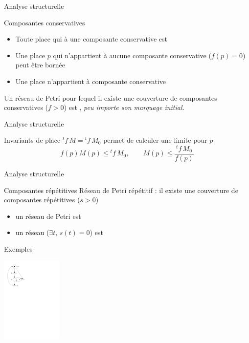 \documentclass[compress]{beamer}
\begin{document}
\begin{frame}{Analyse structurelle}
\begin{block}{Composantes conservatives}
\begin{itemize}
\item Toute place qui  à une composante conservative  est 
\item Une place $p$ qui n'appartient à aucune composante conservative ($f(p)=0$) peut être bornée
\item Une place  n'appartient à  composante conservative
\end{itemize}
Un réseau de Petri pour lequel il existe une couverture de composantes 
conservatives ($f>0$) est , {\it peu importe son marquage initial.}
\end{block}
\end{frame}  
 
\begin{frame}{Analyse structurelle}
\begin{block}{Invariants de place}
${}^tf \, M = {}^tf \, M_0$ permet de calculer une limite pour  $p$
$$f(p) M(p) \leq {}^tf \, M_0, \qquad M(p) \leq \frac{{}^tf \, M_0}{f(p)}$$
\end{block}
\end{frame}  

\begin{frame}{Analyse structurelle}
\begin{block}{Composantes répétitives}
Réseau de Petri répétitif : il existe une couverture de composantes répétitives ($s>0$)
	\begin{itemize}
	\item un réseau de Petri  est 
	\item un réseau  ($\exists t, \, s(t)=0$) est 
	\end{itemize}
\end{block}
\end{frame}  
   
\begin{frame}{Exemples}
\begin{center}
	\includegraphics[width=3cm]{exemplea} 
\end{center}
\end{frame}
\end{document}
